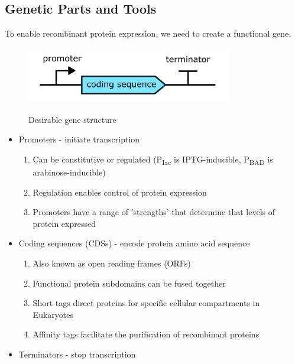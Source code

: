\subsection{Genetic Parts and Tools}
To enable recombinant protein expression, we need to create a functional gene.
\begin{figure}[h]
\centering
\includegraphics[width=0.8\textwidth]{images/5-1.png}\\[.2in]
\caption{Desirable gene structure}
\end{figure}
\FloatBarrier
\begin{itemize}
    \item Promoters - initiate transcription
    \begin{enumerate}
        \item Can be constitutive or regulated (P\textsubscript{Iac} is IPTG-inducible, P\textsubscript{BAD} is arabinose-inducible)
        \item Regulation enables control of protein expression
        \item Promoters have a range of 'strengths' that determine that levels of protein expressed
    \end{enumerate}
    \item Coding sequences (CDSs) - encode protein amino acid sequence
    \begin{enumerate}
        \item Also known as open reading frames (ORFs)
        \item Functional protein subdomains can be fused together
        \item Short tags direct proteins for specific cellular compartments in Eukaryotes
        \item Affinity tags facilitate the purification of recombinant proteins
    \end{enumerate}
    \item Terminators - stop transcription
\end{itemize}
